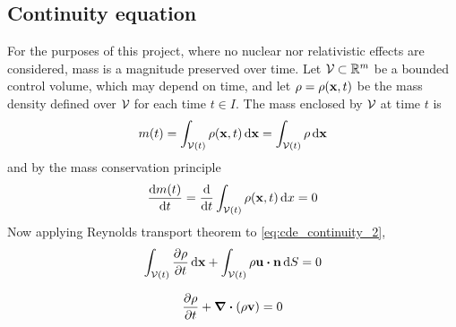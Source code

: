 
\subsection{Continuity equation}

For the purposes of this project, where no nuclear nor relativistic effects are considered, mass is a magnitude preserved over time. Let $\mathcal{V}_{} \subset \mathbb{R}^m$ be a bounded control volume, which may depend on time, and let $\rho = \rho(\vb{x}, t)$ be the mass density defined over $\mathcal{V}_{}$ for each time $t \in I$. The mass enclosed by $\mathcal{V}_{}$ at time $t$ is
\begin{equation} \label{eq:cde_continuity_1}
	m(t) = \int_{\mathcal{V}_{}(t)} \rho(\vb{x}, t) \dd{\vb{x}} = \int_{\mathcal{V}_{}(t)} \rho \dd{\vb{x}}
\end{equation}
and by the mass conservation principle
\begin{equation} \label{eq:cde_continuity_2}
	\frac{\dd m(t)}{\dd{t}} = 
	\frac{\dd}{\dd{t}} \int_{\mathcal{V}_{}(t)} \rho(\vb{x}, t) \dd{x} = 0
\end{equation}
Now applying Reynolds transport theorem to \eqref{eq:cde_continuity_2},
\begin{equation}
	\int_{\cv{}(t)} \frac{\partial \rho}{\partial t} \dd{\vb{x}} + 
	\int_{\cv{}(t)} \rho \vb{u} \vdot \vb{n} \dd{S} = 0
\end{equation}

\begin{equation}
	\pdv{\rho}{t} + \div(\rho \vb{v}) = 0
\end{equation}

